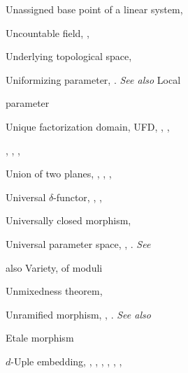 {{\vspace{8.55bp}
\noindent\hspace*{0.0bp}Unassigned base point of a linear system, \par
\noindent\hspace*{0.0bp}Uncountable field, , \par
\noindent\hspace*{0.0bp}Underlying topological space, \par
\noindent\hspace*{0.0bp}Uniformizing parameter, . \emph{See also} Local\par
\noindent\hspace*{15.0bp}parameter\par
\noindent\hspace*{0.0bp}Unique factorization domain, UFD, , ,\par
\noindent\hspace*{15.0bp}, , , \par
\noindent\hspace*{0.0bp}Union of two planes, , , , \par
\noindent\hspace*{0.0bp}Universal $\delta$-functor, , , \par
\noindent\hspace*{0.0bp}Universally closed morphism, \par
\noindent\hspace*{0.0bp}Universal parameter space, , . \emph{See}\par
\noindent\hspace*{15.0bp}also Variety, of moduli\par
\noindent\hspace*{0.0bp}Unmixedness theorem, \par
\noindent\hspace*{0.0bp}Unramified morphism, , . \emph{See also}\par
\noindent\hspace*{15.0bp}Etale morphism\par
\noindent\hspace*{0.0bp}$d$-Uple embedding, , , , , , ,\par
}}
